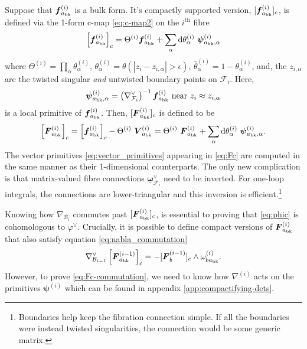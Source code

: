 \documentclass[11pt]{article}
\renewcommand{\d}{\text{d}}
\newcommand{\be}{\begin{equation}}
\newcommand{\ee}{\end{equation}}
\newcommand{\F}{\mathcal{F}}
\newcommand{\B}{\mathcal{B}}
\newcommand{\bk}{{\rm bk}}
\newcommand{\vphi}{\varphi}
\newcommand{\bs}[1]{\boldsymbol{#1}}
\newcommand{\mat}[1]{\underline{\boldsymbol{#1}}}
\begin{document}
Suppose that $\bs{f}^{(i)}_{a_\bk}$ is a bulk form. It's compactly supported version, $[\bs{f}^{(i)}_{a_\bk}]_c$, is defined via the 1-form c-map \eqref{eq:c-map2} on the $i^\text{th}$ fibre
\be \label{eq:vector_primitives}
	\left[\bs{f}^{(i)}_{a_\bk}\right]_c 
	= \Theta^{(i)}  \bs{f}^{(i)}_{a_\bk} 
		+ \sum_\alpha  \d\theta^{(i)}_\alpha\ \bs{\psi}^{(i)}_{{a_\bk},\alpha}
\ee
where 
$\Theta^{(i)} = \prod_\alpha \theta^{(i)}_\alpha$,
$\theta^{(i)}_\alpha = \theta(|z_i - z_{i,\alpha}|>\epsilon)$, 
$\bar{\theta}^{(i)}_\alpha = 1-\theta^{(i)}_\alpha$, 
and, the $z_{i,\alpha}$ are the twisted singular \emph{and} untwisted boundary points on $\F_i$. Here,
\be
	\bs{\psi}^{(i)}_{{a_\bk},\alpha} 
	= \left(\nabla_{\F_i}^\vee\right)^{-1} \bs{f}^{(i)}_{a_\bk}
	\text{ near } z_i \approx z_{i,\alpha}
\ee
is a local primitive of $\bs{f}^{(i)}_{a_\bk}$. 
Then, $[\bs{F}^{(i)}_{a_\bk}]_c$ is defined to be 
\be \label{eq:Fc}
	\left[\bs{F}^{(i)}_{a_\bk}\right]_c 
	= \left[\bs{f}^{(i)}_{a_\bk}\right]_c 
		- \Theta^{(i)}\ \bs{V}^{(i)}_{a_\bk}
	= \Theta^{(i)}\ \bs{F}^{(i)}_{a_\bk} 	
		+ \sum_\alpha  \d\theta^{(i)}_\alpha \ \bs{\psi}^{(i)}_{{a_\bk},\alpha}.	 
\ee
The vector primitives \eqref{eq:vector_primitives} appearing in \eqref{eq:Fc} are computed in the same manner as their 1-dimensional counterparts. The only new complication is that matrix-valued fibre connections $\mat{\omega}_{\F_i}^\vee$ need to be inverted. For one-loop integrals, the connections are lower-triangular and this inversion is efficient.\footnote{Boundaries help keep the fibration connection simple. If all the boundaries were instead twisted singularities, the connection would be some generic matrix.}

Knowing how $\nabla_{\B_i}$ commutes past $[\bs{F}^{(i)}_{a_\bk}]_c$, is essential to proving that \eqref{eq:phic} is cohomologous to $\vphi^\vee$. Crucially, it is possible to define compact versions of $\bs{F}^{(i)}_{a_\bk}$ that also satisfy equation \eqref{eq:nabla_commutation}
\be \label{eq:Fc-commutation}
	\nabla^\vee_{\B_{i-1}} \left[\bs{F}^{(i-1)}_{a_\bk}\right]_c 
		= - [\bs{F}^{(i-1)}_b]_c \wedge \omega^{(i)}_{b{a_\bk}}.
\ee
However, to prove \eqref{eq:Fc-commutation}, we need to know how $\nabla^{(i)}$ acts on the primitives $\bs{\psi}^{(i)}$ which can be found in appendix \ref{app:compactifying-dets}. 
\end{document}
